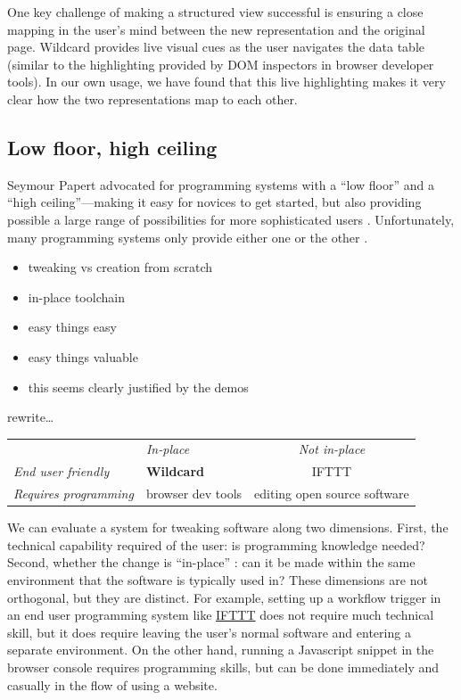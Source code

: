 \documentclass[english,submission]{programming}
\providecommand{\tightlist}{%
  \setlength{\itemsep}{0pt}\setlength{\parskip}{0pt}}
\begin{document}
One key challenge of making a structured view successful is ensuring a
close mapping in the user's mind between the new representation and the
original page. Wildcard provides live visual cues as the user navigates
the data table (similar to the highlighting provided by DOM inspectors
in browser developer tools). In our own usage, we have found that this
live highlighting makes it very clear how the two representations map to
each other.

\hypertarget{low-floor-high-ceiling}{%
\subsection{Low floor, high ceiling}\label{low-floor-high-ceiling}}

Seymour Papert advocated for programming systems with a ``low floor''
and a ``high ceiling''---making it easy for novices to get started, but
also providing possible a large range of possibilities for more
sophisticated users \autocite{resnick2016}. Unfortunately, many
programming systems only provide either one or the other
\autocite{myers2000}.

\begin{itemize}
\tightlist
\item
  tweaking vs creation from scratch
\item
  in-place toolchain
\item
  easy things easy
\item
  easy things valuable
\item
  this seems clearly justified by the demos
\end{itemize}

rewrite\ldots{}

\begin{longtable}[]{@{}llc@{}}
\toprule
\endhead
& \emph{In-place} & \emph{Not in-place}\tabularnewline
\emph{End user friendly} & \textbf{Wildcard} & IFTTT\tabularnewline
\emph{Requires programming} & browser dev tools & editing open source
software\tabularnewline
\bottomrule
\end{longtable}

We can evaluate a system for tweaking software along two dimensions.
First, the technical capability required of the user: is programming
knowledge needed? Second, whether the change is ``in-place''
\autocite{inkandswitch2019}: can it be made within the same environment
that the software is typically used in? These dimensions are not
orthogonal, but they are distinct. For example, setting up a workflow
trigger in an end user programming system like
\href{https://ifttt.com/}{IFTTT} does not require much technical skill,
but it does require leaving the user's normal software and entering a
separate environment. On the other hand, running a Javascript snippet in
the browser console requires programming skills, but can be done
immediately and casually in the flow of using a website.
\end{document}
